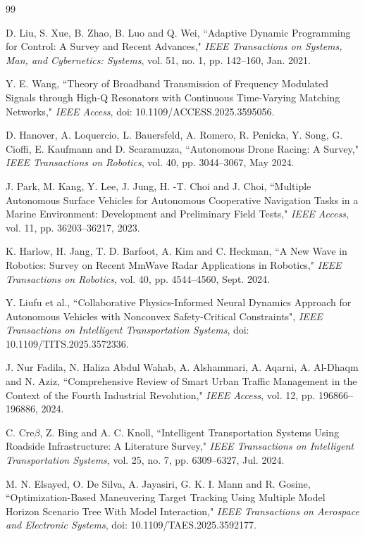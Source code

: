 \documentclass[pdflatex,sn-mathphys,Numbered]{sn-jnl}
\theoremstyle{thmstyleone}
\theoremstyle{thmstyletwo}
\theoremstyle{thmstylethree}
\begin{document}
\begin{thebibliography}{99}

 D. Liu, S. Xue, B. Zhao, B. Luo and Q. Wei, ``Adaptive Dynamic Programming for Control: A Survey and Recent Advances," \emph{IEEE Transactions on Systems, Man, and Cybernetics: Systems}, vol. 51, no. 1, pp. 142--160, Jan. 2021.

 Y. E. Wang, ``Theory of Broadband Transmission of Frequency Modulated Signals through High-Q Resonators with Continuous Time-Varying Matching Networks," \emph{IEEE Access}, doi: 10.1109/ACCESS.2025.3595056.

 D. Hanover, A. Loquercio, L. Bauersfeld, A. Romero, R. Penicka, Y. Song, G. Cioffi, E.  Kaufmann and D. Scaramuzza, ``Autonomous Drone Racing: A Survey," \emph{IEEE Transactions on Robotics}, vol. 40, pp. 3044--3067, May 2024.

 J. Park, M. Kang, Y. Lee, J. Jung, H. -T. Choi and J. Choi, ``Multiple Autonomous Surface Vehicles for Autonomous Cooperative Navigation Tasks in a Marine Environment: Development and Preliminary Field Tests," \emph{IEEE Access}, vol. 11, pp. 36203--36217, 2023.

 K. Harlow, H. Jang, T. D. Barfoot, A. Kim and C. Heckman, ``A New Wave in Robotics: Survey on Recent MmWave Radar Applications in Robotics," \emph{IEEE Transactions on Robotics}, vol. 40, pp. 4544--4560, Sept. 2024.

 Y. Liufu et al., ``Collaborative Physics-Informed Neural Dynamics Approach for Autonomous Vehicles with Nonconvex Safety-Critical Constraints", \emph{IEEE Transactions on Intelligent Transportation Systems}, doi: 10.1109/TITS.2025.3572336.

 J. Nur Fadila, N. Haliza Abdul Wahab, A. Alshammari, A. Aqarni, A. Al-Dhaqm and N. Aziz, ``Comprehensive Review of Smart Urban Traffic Management in the Context of the Fourth Industrial Revolution,"  \emph{IEEE Access}, vol. 12, pp. 196866--196886, 2024.

 C. Cre$\beta$, Z. Bing and A. C. Knoll, ``Intelligent Transportation Systems Using Roadside Infrastructure: A Literature Survey," \emph{IEEE Transactions on Intelligent Transportation Systems}, vol. 25, no. 7, pp. 6309--6327, Jul. 2024.

 M. N. Elsayed, O. De Silva, A. Jayasiri, G. K. I. Mann and R. Gosine, ``Optimization-Based Maneuvering Target Tracking Using Multiple Model Horizon Scenario Tree With Model Interaction," \emph{IEEE Transactions on Aerospace and Electronic Systems}, doi: 10.1109/TAES.2025.3592177.


\end{thebibliography}
\end{document}
